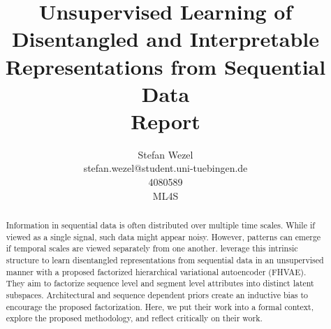 \documentclass{article} %
\title{Unsupervised Learning of Disentangled and Interpretable Representations from Sequential Data\\ \vspace{0.5cm}\large{Report}}
\author{Stefan Wezel \\ stefan.wezel@student.uni-tuebingen.de \\4080589  \\ ML4S}
\def\figwidth{.5\linewidth}
\def\figheight{.15\textheight}
\begin{document}
\maketitle

\begin{abstract}

%



Information in sequential data is often distributed over multiple time scales.
While if viewed as a single signal, such data might appear noisy. However, patterns can emerge if temporal scales are viewed separately from one another.
\citet{hsu2017unsupervised} leverage this intrinsic structure to learn disentangled representations from sequential data in an unsupervised manner with a proposed factorized hierarchical variational autoencoder (FHVAE). They aim to factorize sequence level and segment level attributes into distinct latent subspaces. Architectural and sequence dependent priors create an inductive bias to encourage the proposed factorization. Here, we put their work into a formal context, explore the proposed methodology, and reflect critically on their work.
\end{abstract}
\end{document}
